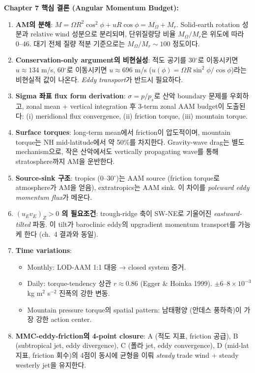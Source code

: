 \begin{remarkbox}
\textbf{Chapter 7 핵심 결론 (Angular Momentum Budget):}
\begin{enumerate}
  \item \textbf{AM의 분해}: $M = \Omega R^2\cos^2\phi + uR\cos\phi
    = M_\Omega + M_r$.  Solid-earth rotation 성분과 relative wind 성분으로
    분리되며, 단위질량당 비율 $M_\Omega/M_r$은 위도에 따라 0--46.  대기 전체
    질량 적분 기준으로는 $M_\Omega/M_r \sim 100$ 정도이다.
  \item \textbf{Conservation-only argument의 비현실성}: 적도 공기를 30$^\circ$로
    이동시키면 $u\approx 134$ m/s, 60$^\circ$로 이동시키면 $u \approx 696$ m/s
    ($u(\phi) = \Omega R\sin^2\phi/\cos\phi$)라는 비현실적 값이 나온다.
    \emph{Eddy transport}가 반드시 필요하다.
  \item \textbf{Sigma 좌표 flux form derivation}: $\sigma = p/p_s$로 산악
    boundary 문제를 우회하고, zonal mean + vertical integration 후 3-term
    zonal AAM budget이 도출된다:
    (i) meridional flux convergence, (ii) friction torque, (iii) mountain torque.
  \item \textbf{Surface torques}: long-term mean에서 friction이 압도적이며,
    mountain torque는 NH mid-latitude에서 약 50\%를 차지한다.  Gravity-wave
    drag는 별도 mechanism으로, 작은 산악에서도 vertically propagating wave를
    통해 stratosphere까지 AM을 운반한다.
  \item \textbf{Source-sink 구조}: tropics (0--30$^\circ$)는 AAM source
    (friction torque로 atmosphere가 AM을 얻음), extratropics는 AAM sink.
    이 차이를 \emph{poleward eddy momentum flux}가 메운다.
  \item \textbf{$(u_E v_E)_Z > 0$ 의 필요조건}: trough-ridge 축이 SW-NE로
    기울어진 \emph{eastward-tilted} 파동.  이 tilt가 baroclinic eddy의
    upgradient momentum transport를 가능케 한다 (ch.~4 결과와 동일).
  \item \textbf{Time variations}:
    \begin{itemize}
      \item Monthly: LOD-AAM 1:1 대응 → closed system 증거.
      \item Daily: torque-tendency 상관 $r\approx 0.86$ (Egger \& Hoinka 1999).
        $\pm 6$--$8\times 10^{-3}$ kg m$^2$ s$^{-2}$ 진폭의 강한 변동.
      \item Mountain pressure torque의 spatial pattern: 남태평양 (안데스
        풍하측)이 가장 강한 action center.
    \end{itemize}
  \item \textbf{MMC-eddy-friction의 4-point closure}: A (적도 지표, friction
    공급), B (subtropical jet, eddy divergence), C (폴라 jet, eddy convergence),
    D (mid-lat 지표, friction 회수)의 4점이 동시에 균형을 이뤄 \emph{steady}
    trade wind + steady westerly jet을 유지한다.
\end{enumerate}
\end{remarkbox}


